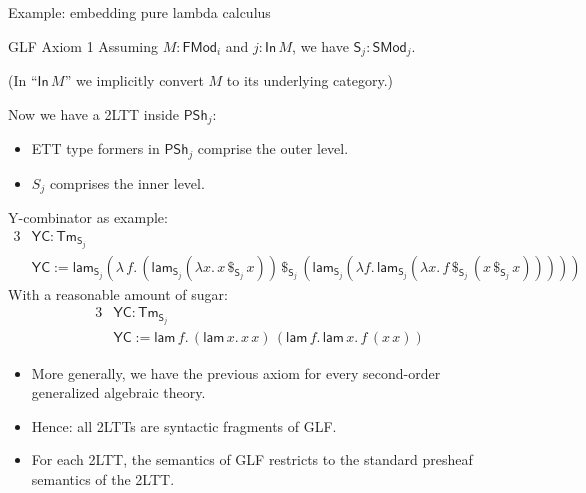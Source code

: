 \documentclass[dvipsnames,aspectratio=169]{beamer}
\newcommand{\ms}[1]{\mathsf{#1}}
\newcommand{\Tm}{\mathsf{Tm}}
\newcommand{\In}{\mathsf{In}}
\newcommand{\PSh}{\mathsf{PSh}}
\newcommand{\SMod}{\mathsf{SMod}}
\newcommand{\FMod}{\mathsf{FMod}}
\renewcommand{\S}{\mathsf{S}}
\newcommand{\lam}{\ms{lam}}
\begin{document}
\begin{frame}{Example: embedding pure lambda calculus}

\begin{block}{GLF Axiom 1}
  Assuming $M : \FMod_i$ and $j : \In\,M$, we have $\S_j : \SMod_j$.

  {\footnotesize (In ``$\In\,M$'' we implicitly convert $M$ to its underlying category.)}
\end{block}
\vspace{0.5em}

Now we have a 2LTT inside $\PSh_j$:
\begin{itemize}
\item ETT type formers in $\PSh_j$ comprise the outer level.
\item $S_j$ comprises the inner level.
\end{itemize}
\vspace{0.5em}
\pause
Y-combinator as example:
\begin{alignat*}{3}
  & \ms{YC} : \Tm_{\S_j} \\
  & \ms{YC} := \lam_{\S_j}(\lambda\,f.\,(\lam_{\S_j} (\lambda x.\, x\,\$_{\S_j}\,x))\,\$_{\S_j}\,
               (\lam_{\S_j} (\lambda f.\,\lam_{\S_j} (\lambda x.\, f \,\$_{\S_j}\, (x \,\$_{\S_j}\, x)))))
\end{alignat*}
\pause
With a reasonable amount of sugar:
\begin{alignat*}{3}
  & \ms{YC} : \Tm_{\S_j} \\
  & \ms{YC} := \lam\,f.\,(\lam\,x.\,x\,x)\,(\lam\,f.\,\lam\,x.\,f\,(x\,x))
\end{alignat*}

\end{frame}

\begin{frame}{}

\begin{itemize}
\item More generally, we have the previous axiom for every second-order generalized algebraic theory.
\item Hence: all 2LTTs are syntactic fragments of GLF.
\item For each 2LTT, the semantics of GLF restricts to the standard presheaf semantics of the 2LTT.
\end{itemize}


\end{frame}
\end{document}
